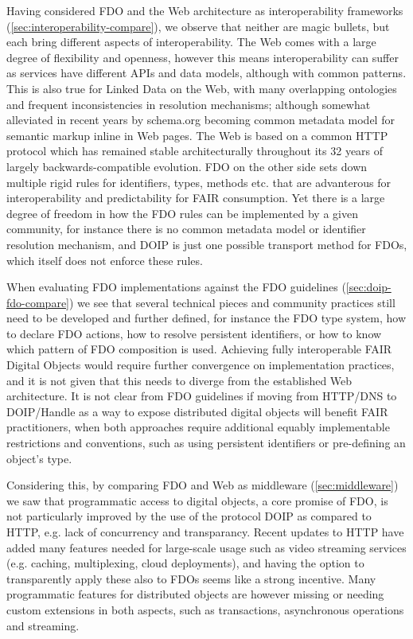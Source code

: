 \documentclass[fleqn,10pt,lineno]{wlpeerjlua}
\begin{document}
Having considered FDO and the Web architecture as interoperability frameworks (\vref*{sec:interoperability-compare}), we observe that neither are magic bullets, but each bring different aspects of interoperability. The Web comes with a large degree of flexibility and openness, however this means interoperability can suffer as services have different APIs and data models, although with common patterns. This is also true for Linked Data on the Web, with many overlapping ontologies and frequent inconsistencies in resolution mechanisms; although somewhat alleviated in recent years by schema.org becoming common metadata model for semantic markup inline in Web pages. The Web is based on a common HTTP protocol which has remained stable architecturally throughout its 32 years of largely backwards-compatible evolution. FDO on the other side sets down multiple rigid rules for identifiers, types, methods etc. that are advanterous for interoperability and predictability for FAIR consumption. Yet there is a large degree of freedom in how the FDO rules can be implemented by a given community, for instance there is no common metadata model or identifier resolution mechanism, and DOIP is just one possible transport method for FDOs, which itself does not enforce these rules. 

When evaluating FDO implementations against the FDO guidelines (\vref*{sec:doip-fdo-compare}) we see that several technical pieces and community practices still need to be developed and further defined, for instance the FDO type system, how to declare FDO actions, how to resolve persistent identifiers, or how to know which pattern of FDO composition is used. Achieving fully interoperable FAIR Digital Objects would require further convergence on implementation practices, and it is not given that this needs to diverge from the established Web architecture.  It is not clear from FDO guidelines if moving from HTTP/DNS to DOIP/Handle as a way to expose distributed digital objects will benefit FAIR practitioners, when both approaches require additional equably implementable restrictions and conventions, such as using persistent identifiers or pre-defining an object's type. 

Considering this, by comparing FDO and Web as middleware (\vref*{sec:middleware}) we saw that programmatic access to digital objects, a core promise of FDO, is not particularly improved by the use of the protocol DOIP as compared to HTTP, e.g. lack of concurrency and transparancy. Recent updates to HTTP have added many features needed for large-scale usage such as video streaming services (e.g. caching, multiplexing, cloud deployments), and having the option to transparently apply these also to FDOs seems like a strong incentive. Many programmatic features for distributed objects are however missing or needing custom extensions in both aspects, such as transactions, asynchronous operations and streaming.
\end{document}
